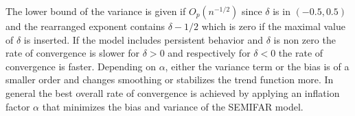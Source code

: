 \documentclass[12pt]{article}
\newcommand{\code}[1]{\texttt{#1}}
\begin{document}
The lower bound of the variance is given if \( O_p(n^{-1/2}) \) since \(\delta\) is in \((-0.5,0.5)\) and the rearranged exponent contains \(\delta-1/2\) which is zero if the maximal value of \(\delta\) is inserted.  
If the model includes persistent behavior and \(\delta\) is non zero the rate of convergence is slower for \(\delta > 0\) and respectively 
for \(\delta < 0\) the rate of convergence is faster. 
Depending on \( \alpha \), either the variance term or the bias is of a smaller order and changes smoothing or stabilizes the trend function more.
In general the best overall rate of convergence is achieved by applying an inflation factor \(\alpha\) that minimizes the bias and variance of the SEMIFAR model.

    
\end{document}

